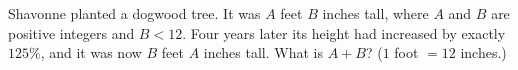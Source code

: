 Shavonne planted a dogwood tree. It was $A$ feet $B$ inches tall, where $A$ and $B$ are positive integers and $B<12$. Four years later its height had increased by exactly $125\%$, and it was now $B$ feet $A$ inches tall. What is $A+B$? ($1$ foot $=12$ inches.)
